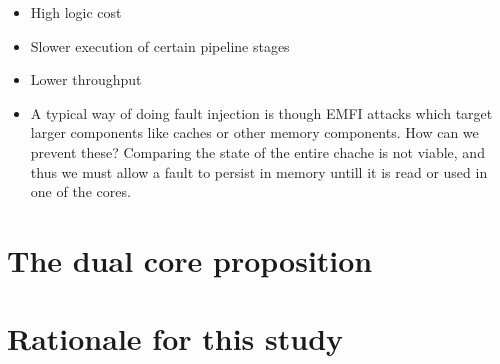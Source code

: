 \begin{itemize}
    \item High logic cost 
    \item Slower execution of certain pipeline stages
    \item Lower throughput 
    \item A typical way of doing fault injection is though EMFI attacks which target larger components like caches or other memory components.
    How can we prevent these? Comparing the state of the entire chache is not viable, and thus we must allow a fault to persist in 
    memory untill it is read or used in one of the cores.
\end{itemize}
\section{The dual core proposition}
\section{Rationale for this study}

